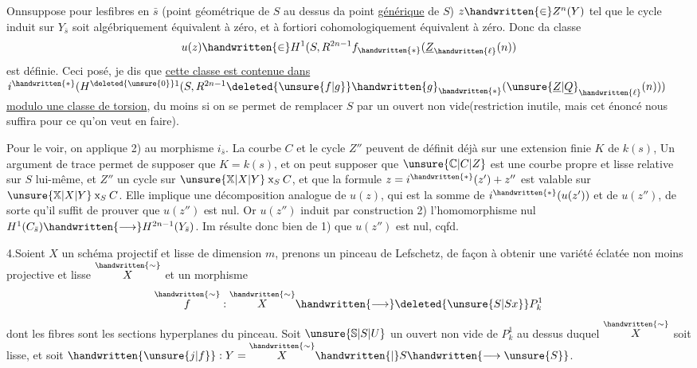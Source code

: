 Onnsuppose   pour lesfibres en $\bar s$ (point géométrique  de $S$ au dessus da point \uline{générique} de $S$)   $z\handwritten{\in}Z^n(Y)$ tel que le cycle induit sur $Y_{\bar s}$ soit algébriquement équivalent à zéro, et à fortiori cohomologiquement équivalent à zéro. Donc da classe
\[
u(z)\handwritten{\in}H^1(S,R^{2n-1}f_{\handwritten{*}}(\underline{Z}_{\handwritten{\ell}}(n))
\]
est définie. Ceci posé, je dis que \uline{cette classe est  contenue dans} $i^{\handwritten{*}}(H^{\deleted{\unsure{0}}1}(S,R^{2n-1}\deleted{\unsure{f|g}}\handwritten{g}_{\handwritten{*}}({\unsure{\underline{Z}|\underline{Q}}}_{\handwritten{\ell}}(n)))$ \uline{modulo une classe de torsion}, du moins si on    se permet de remplacer $S$ par un ouvert non vide(restriction  inutile, mais cet énoncé nous suffira pour ce qu'on veut en faire).

Pour le voir, on applique 2) au morphisme $i_{\bar s}$. La courbe $C$ et le cycle $Z''$ peuvent de définit déjà sur une extension finie $K$ de $k(s)$, Un argument de trace permet de supposer que $K=k(s)$, et  on peut supposer que $\unsure{\mathbb{C}|C|Z}$  est une courbe propre et lisse relative sur $S$ lui-même, et $Z''$ un cycle sur $\unsure{\mathbb{X}|X|Y}\mathbin{\mathrm{x}}_S C$,  et que la formule $z=i^{\handwritten{*}}(z')+z''$ est valable sur $\unsure{\mathbb{X}|X|Y}\mathbin{\mathrm{x}}_S C$. Elle implique une décomposition analogue de $u(z)$, qui est la somme de $i^{\handwritten{*}}(u(z'))$ et de $u(z'')$, de sorte qu'il suffit de prouver que $u(z'')$ est nul. Or $u(z'')$ induit par construction 2) l'homomorphisme nul $H^1(C_{\bar s})\handwritten{\longrightarrow}H^{2n-1}(Y_{\bar s})$. Im résulte donc bien de 1) que $u(z'')$ est nul, cqfd.

4.\quad Soient $X$ un schéma projectif et lisse de dimension $m$, prenons un pinceau de Lefschetz, de façon à obtenir une variété éclatée non moins projective et lisse $\overset{\handwritten{\sim}}{X}$ et un morphisme
\[
\overset{\handwritten{\sim}}{f}:\overset{\handwritten{\sim}}{X}\handwritten{\longrightarrow}\deleted{\unsure{S|Sx}}P^1_k
\]
dont les fibres sont les sections hyperplanes du pinceau. Soit $\unsure{\mathbb{S}|S|U}$ un ouvert non vide de $P^1_k$ au dessus duquel $\overset{\handwritten{\sim}}{X}$ soit lisse, et soit $\handwritten{\unsure{j|f}}:Y=\overset{\handwritten{\sim}}{X}\handwritten{|}S\handwritten{\longrightarrow\unsure{S}}$.
